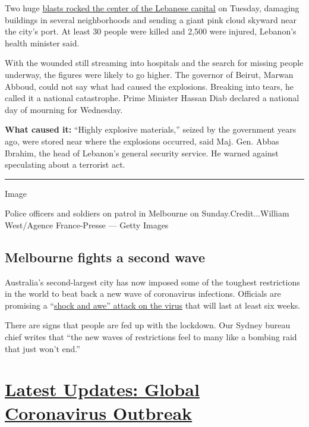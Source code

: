Two huge
\href{https://www.nytimes3xbfgragh.onion/2020/08/04/world/middleeast/beirut-explosion-blast.html?action=click\&module=Top\%20Stories\&pgtype=Homepage}{blasts
rocked the center of the Lebanese capital} on Tuesday, damaging
buildings in several neighborhoods and sending a giant pink cloud
skyward near the city's port. At least 30 people were killed and 2,500
were injured, Lebanon's health minister said.

With the wounded still streaming into hospitals and the search for
missing people underway, the figures were likely to go higher. The
governor of Beirut, Marwan Abboud, could not say what had caused the
explosions. Breaking into tears, he called it a national catastrophe.
Prime Minister Hassan Diab declared a national day of mourning for
Wednesday.

\textbf{What caused it:} ``Highly explosive materials,'' seized by the
government years ago, were stored near where the explosions occurred,
said Maj. Gen. Abbas Ibrahim, the head of Lebanon's general security
service. He warned against speculating about a terrorist act.

\begin{center}\rule{0.5\linewidth}{\linethickness}\end{center}

Image

Police officers and soldiers on patrol in Melbourne on
Sunday.Credit...William West/Agence France-Presse --- Getty Images

\hypertarget{melbourne-fights-a-second-wave}{%
\subsection{Melbourne fights a second
wave}\label{melbourne-fights-a-second-wave}}

Australia's second-largest city has now imposed some of the toughest
restrictions in the world to beat back a new wave of coronavirus
infections. Officials are promising a
``\href{https://www.nytimes3xbfgragh.onion/2020/08/04/world/australia/coronavirus-melbourne-lockdown.html}{shock
and awe'' attack on the virus} that will last at least six weeks.

There are signs that people are fed up with the lockdown. Our Sydney
bureau chief writes that ``the new waves of restrictions feel to many
like a bombing raid that just won't end.''

\hypertarget{latest-updates-global-coronavirus-outbreak}{%
\section{\texorpdfstring{\href{https://www.nytimes3xbfgragh.onion/2020/08/04/world/coronavirus-cases.html?action=click\&pgtype=Article\&state=default\&region=MAIN_CONTENT_1\&context=storylines_live_updates}{Latest
Updates: Global Coronavirus
Outbreak}}{Latest Updates: Global Coronavirus Outbreak}}\label{latest-updates-global-coronavirus-outbreak}}

